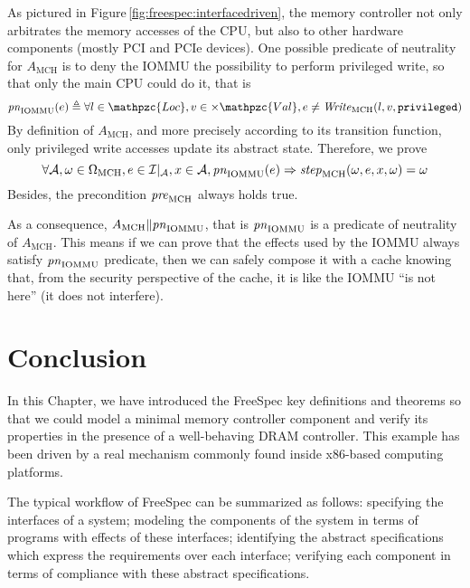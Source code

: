 \begin{example}
  As pictured in Figure\,\ref{fig:freespec:interfacedriven}, the memory
  controller not only arbitrates the memory accesses of the CPU, but also to
  other hardware components (mostly PCI and PCIe devices).
  One possible predicate of neutrality for $A_{\mathrm{MCH}}$ is to deny
  the IOMMU the possibility to perform privileged write, so that only the main
  CPU could do it, that is
  \[
    \func{pn}_{\mathrm{IOMMU}}(e) \triangleq \forall l \in \mathpzc{Loc}, v \in
    \times \mathpzc{Val}, e \neq \func{Write}_{\mathrm{MCH}}(l, v,
    \texttt{privileged})
  \]
  By definition of \( A_{\mathrm{MCH}} \), and more precisely according to its
  transition function, only privileged write accesses update its abstract state.
  Therefore, we prove
  \[
    \forall \mathcal{A}, \omega \in \Omega_{\mathrm{MCH}}, e \in
    \mathcal{I}|_{\mathrm{\mathcal{A}}}, x \in \mathcal{A},
    \mathit{pn}_{\mathrm{IOMMU}}(e) \Rightarrow
    \mathit{step}_{\mathrm{MCH}}(\omega, e, x, \omega) = \omega
  \]
  Besides, the precondition \( \mathit{pre}_{\mathrm{MCH}} \) always holds true.

  As a consequence, \( A_{\mathrm{MCH}} \| \mathit{pn}_{\mathrm{IOMMU}} \), that
  is \( \mathit{pn}_{\mathrm{IOMMU}} \) is a predicate of neutrality of
  \( A_{\mathrm{MCH}} \).
  This means if we can prove that the effects used by the IOMMU always satisfy
  \( \mathit{pn}_{\mathrm{IOMMU}} \) predicate, then we can safely compose it
  with a cache knowing that, from the security perspective of the cache, it is
  like the IOMMU ``is not here'' (it does not interfere).
\end{example}

\section{Conclusion}
\label{sec:freespec:scale}

In this Chapter, we have introduced the FreeSpec key definitions and theorems so
that we could model a minimal memory controller component and verify its
properties in the presence of a well-behaving DRAM controller.
%
This example has been driven by a real mechanism commonly found inside x86-based
computing platforms.
%

The typical workflow of FreeSpec can be summarized as follows: specifying the
interfaces of a system; modeling the components of the system in terms of
programs with effects of these interfaces; identifying the abstract
specifications which express the requirements over each interface; verifying
each component in terms of compliance with these abstract specifications.

